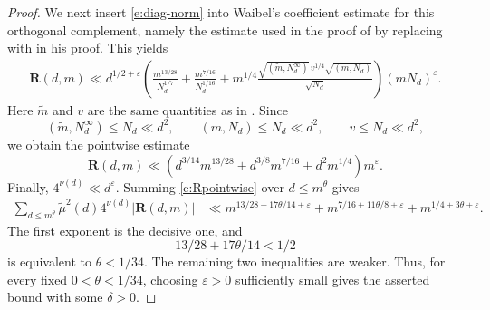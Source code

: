 \documentclass[10pt,a4paper]{amsart}
\numberwithin{equation}{section}
\begin{document}
\begin{proof}
We next insert \eqref{e:diag-norm} into Waibel's coefficient estimate for this orthogonal complement, namely the estimate used in the proof of \cite[Lemma 13]{Wa} by replacing \cite[Theorem 1]{Wa} with \cite[Theorem 2]{Wa} in his proof. This yields
\begin{align}\label{e:Rpointwise-new}
\mathbf R(d,m)
\ll d^{1/2+\varepsilon}
\left(
\frac{m^{13/28}}{N_d^{1/7}}
+
\frac{m^{7/16}}{N_d^{1/16}}
+
 m^{1/4}
\frac{\sqrt{(\widetilde m,N_d^\infty)}\,v^{1/4}\sqrt{(m,N_d)}}{\sqrt{N_d}}
\right)(mN_d)^\varepsilon.
\end{align}
Here $\widetilde m$ and $v$ are the same quantities as in \cite[Lemma 13]{Wa}. Since
\[
(\widetilde m,N_d^\infty)\leq N_d\ll d^2,
\qquad
(m,N_d)\leq N_d\ll d^2,
\qquad
v\leq N_d\ll d^2,
\]
we obtain the pointwise estimate
\begin{equation}\label{e:Rpointwise}
\mathbf R(d,m)
\ll
\left(d^{3/14}m^{13/28}+d^{3/8}m^{7/16}+d^2m^{1/4}\right)m^\varepsilon.
\end{equation}
Finally, $4^{\nu(d)}\ll d^\varepsilon$. Summing \eqref{e:Rpointwise} over $d\leq m^\theta$ gives
\begin{align*}
\sum_{d\leq m^\theta}\widetilde\mu^2(d)4^{\nu(d)}|\mathbf R(d,m)|
&\ll
m^{13/28+17\theta/14+\varepsilon}
+m^{7/16+11\theta/8+\varepsilon}
+m^{1/4+3\theta+\varepsilon}.
\end{align*}
The first exponent is the decisive one, and
\[
13/28+17\theta/14<1/2
\]
is equivalent to $\theta<1/34$. The remaining two inequalities are weaker. Thus, for every fixed $0<\theta<1/34$, choosing $\varepsilon>0$ sufficiently small gives the asserted bound with some $\delta>0$.
\end{proof}
\end{document}
